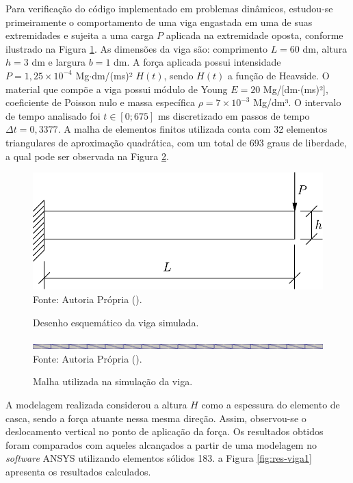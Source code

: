 
Para verificação do código implementado em problemas dinâmicos, estudou-se  primeiramente o comportamento de uma viga engastada em uma de suas extremidades e sujeita a uma carga $P$ aplicada na extremidade oposta, conforme ilustrado na Figura \ref{fig:viga1}. As dimensões da viga são: comprimento $L=60$ dm, altura $h=3$ dm e largura $b=1$ dm. A força aplicada possui intensidade $P=1,25\times10^{-4}$ Mg$\cdot$dm/(ms)² $H(t)$, sendo $H(t)$ a função de Heavside. O material que compõe a viga possui módulo de Young $E=20$ Mg/[dm$\cdot$(ms)²], coeficiente de Poisson nulo e massa específica $\rho=7\times10^{-3}$ Mg/dm³. O intervalo de tempo analisado foi $t\in[0;675]$ ms discretizado em passos de tempo $\Delta t=0,3377$. A malha de elementos finitos utilizada conta com 32 elementos triangulares de aproximação quadrática, com um total de 693 graus de liberdade, a qual pode ser observada na Figura \ref{fig:viga1-mesh}.

\begin{figure}[h!]
    \centering
    \caption{Desenho esquemático da viga simulada.}
    \includegraphics[width=0.5\linewidth]{Figuras/vigas/viga1.pdf}
    \\Fonte: Autoria Própria (\the\year).
    \label{fig:viga1}
\end{figure}

\begin{figure}[h!]
    \centering
    \caption{Malha utilizada na simulação da viga.}
    \includegraphics[width=\linewidth]{Figuras/vigas/mesh1.png}
    \\Fonte: Autoria Própria (\the\year).
    \label{fig:viga1-mesh}
\end{figure}

A modelagem realizada considerou a altura $H$ como a espessura do elemento de casca, sendo a força atuante nessa mesma direção. Assim, observou-se o deslocamento vertical no ponto de aplicação da força. Os resultados obtidos foram comparados com aqueles alcançados a partir de uma modelagem no \textit{software} ANSYS utilizando elementos sólidos 183. a Figura \ref{fig:res-viga1} apresenta os resultados calculados.

